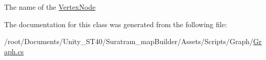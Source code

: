 The name of the \hyperlink{classVertexNode}{Vertex\+Node}



The documentation for this class was generated from the following file\+:\begin{DoxyCompactItemize}
\item 
/root/\+Documents/\+Unity\+\_\+\+S\+T40/\+Suratram\+\_\+map\+Builder/\+Assets/\+Scripts/\+Graph/\hyperlink{Graph_8cs}{Graph.\+cs}\end{DoxyCompactItemize}
